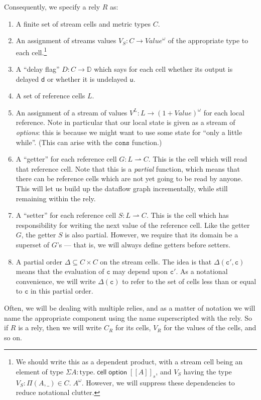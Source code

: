 \documentclass[preprint]{sigplanconf}
\newcommand{\term}[1]{\ensuremath{\mathtt{{#1}}}}
\newcommand{\interps}[1]{[\![{#1}]\!]_s}
\newcommand{\celltype}[1]{\mathsf{cell}\;{#1}}
\newcommand{\opttype}[1]{\mathsf{option}\;{#1}}
\newcommand{\Delays}{\mathbb{D}}
\newcommand{\U}{\mathsf{u}}
\newcommand{\D}{\mathsf{d}}
\begin{document}
Consequently, we specify a rely $R$ as:
\begin{enumerate}
\item A finite set of stream cells and metric types $C$. 
\item An assignment of streams values $V_S : C \to \mathit{Value}^\omega$ 
  of the appropriate type to each cell.\footnote{We should write this 
  as a dependent product, with a stream cell being an element of type 
  $\Sigma A:\mathrm{type}.\;\celltype{\opttype{\interps{A}}}$, and $V_S$ having
  the type $V_S : \Pi (A, \_) \in C.\; A^\omega$. However, we will suppress these 
  dependencies to reduce notational clutter.}
\item A ``delay flag'' $D : C \to \Delays$ which says for each cell whether 
  its output is delayed $\D$ or whether it is undelayed $\U$. 
\item A set of reference cells $L$. 
\item An assignment of a stream of values $V^L : L \to \mathit{(1 +
  \mathit{Value})^\omega}$ for each local reference. Note in
  particular that our local state is given as a stream of
  \emph{options}: this is because we might want to use some state for
  ``only a little while''. (This can arise with the \term{cons}
  function.)
\item A ``getter'' for each reference cell $G : L \rightharpoonup
  C$. This is the cell which will read that reference cell. Note that
  this is a \emph{partial} function, which means that there can be
  reference cells which are not yet going to be read by anyone. This
  will let us build up the dataflow graph incrementally, while still
  remaining within the rely. 
\item A ``setter'' for each reference cell $S : L \rightharpoonup
  C$. This is the cell which has responsibility for writing the next
  value of the reference cell. Like the getter $G$, the getter $S$ is
  also partial. However, we require that its domain be a superset of $G$'s ---
  that is, we will always define getters before setters. 
\item A partial order $\Delta \subseteq C \times C$ on the stream
  cells. The idea is that $\term{\Delta(c',c)}$ means that the
  evaluation of \term{c} may depend upon \term{c'}. As a notational
  convenience, we will write $\Delta(\term{c})$ to refer to the set 
  of cells less than or equal to $\term{c}$ in this partial order. 
\end{enumerate}

Often, we will be dealing with multiple relies, and as a matter of
notation we will name the appropriate component using the name
superscripted with the rely. So if $R$ is a rely, then we will write
$C_R$ for its cells, $V_R$ for the values of the cells, and so on.
\end{document}
